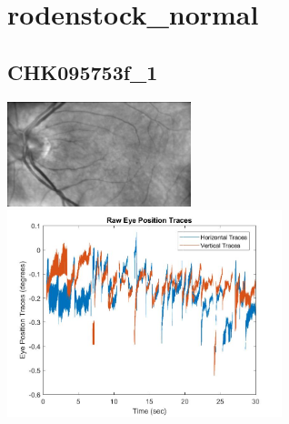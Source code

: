 \documentclass[11pt]{article}
\begin{document}
\section{rodenstock\_normal}

\subsection{CHK095753f\_1}
\includegraphics[width=0.40\textwidth, valign=m]{referenceframes/rodenstock_normal/CHK095753f_1_dwt_nostim_gamscaled_bandfilt_refframe.jpg}
\includegraphics[width=0.60\textwidth, valign=m]{eyepositiontraces/rodenstock_normal/CHK095753f_1.jpg}\\
\end{document}
